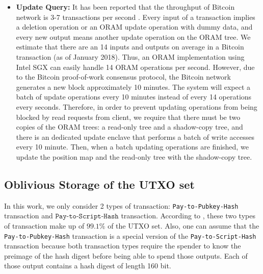 \begin{itemize}
	\item \textbf{Update Query:} 
	It has been reported that the throughput of Bitcoin network is 3-7 transactions per second \cite{scaling-blockchain-3-7}. 
	Every input of a transaction implies a deletion operation or an ORAM update operation with dummy data, 
	and every new output means another update operation on the ORAM tree. 
	We estimate that there are an 14 inputs and outputs on average in a Bitcoin transaction (as of January 2018). 
	Thus,  an ORAM implementation using Intel SGX can easily handle 14 ORAM operations per second.
	However, due to the Bitcoin proof-of-work consensus protocol, the Bitcoin network generates a new block approximately 10 minutes. 
	The system will expect a batch of update operations every 10 minutes instead of every 14 operations every seconds. 
	Therefore, in order to prevent updating operations from being blocked by read requests from client, 
	we require that there must be two copies of the ORAM trees: a read-only tree and a shadow-copy tree, 
	and there is an dedicated update enclave that performs a batch  of write accesses every 10 minute.
	Then, when a batch updating operations are finished, we update the position map and the read-only tree with the shadow-copy tree.

\end{itemize} 

\subsection{Oblivious Storage of the UTXO set}
\label{subsec: Oblivious Storage of the UTXO set}
In this work, we only consider 2 types of transaction: \texttt{Pay-to-Pubkey-Hash} transaction and $\texttt{Pay-to-Script-Hash}$ transaction.
According to \cite{analysis-of-utxo}, these two types of transaction make up of $99.1\%$ of the UTXO set. 
Also, one can assume that the \texttt{Pay-to-Pubkey-Hash} transaction is a special version of the \texttt{Pay-to-Script-Hash} transaction 
because both transaction types require the spender to know the preimage of the hash digest before being able to spend those outputs.  
Each of those output contains a hash digest of length 160 bit.

